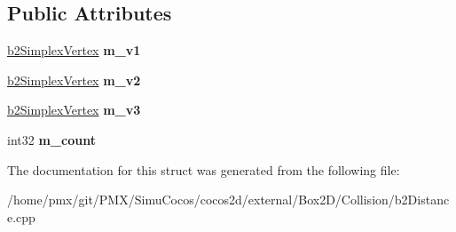 \subsection*{Public Attributes}
\begin{DoxyCompactItemize}
\item 
\mbox{\label{structb2Simplex_a974d030fe572112e6d5212520586eb13}} 
\hyperlink{structb2SimplexVertex}{b2\+Simplex\+Vertex} {\bfseries m\+\_\+v1}
\item 
\mbox{\label{structb2Simplex_a1732c0f9d63e7cdbd405e7a7b2c7b7cb}} 
\hyperlink{structb2SimplexVertex}{b2\+Simplex\+Vertex} {\bfseries m\+\_\+v2}
\item 
\mbox{\label{structb2Simplex_a42ede9ec641aea34e51baf1b43e9ea07}} 
\hyperlink{structb2SimplexVertex}{b2\+Simplex\+Vertex} {\bfseries m\+\_\+v3}
\item 
\mbox{\label{structb2Simplex_ad11c352a25ee324f438515fb8028bd23}} 
int32 {\bfseries m\+\_\+count}
\end{DoxyCompactItemize}


The documentation for this struct was generated from the following file\+:\begin{DoxyCompactItemize}
\item 
/home/pmx/git/\+P\+M\+X/\+Simu\+Cocos/cocos2d/external/\+Box2\+D/\+Collision/b2\+Distance.\+cpp\end{DoxyCompactItemize}
